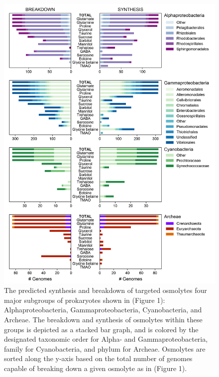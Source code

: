 \documentclass[utf8]{frontiers_suppmat} %
\begin{document}
\begin{figure}[ht]
    \centering
    \includegraphics[width=0.9\columnwidth]{Figures/SI-Groups-Syn_BD-01.png}
    \caption{The predicted synthesis and breakdown of targeted osmolytes four major subgroups of prokaryotes shown in (Figure 1): Alphaproteobacteria, Gammaproteobacteria, Cyanobacteria, and Archeae. The breakdown and synthesis of osmolytes within these groups is depicted as a stacked bar graph, and is colored by the designated taxonomic order for Alpha- and Gammaproteobacteria, family for Cyanobacteria, and phylum for Archeae. Osmolytes are sorted along the y-axis based on the total number of genomes capable of breaking down a given osmolyte as in (Figure 1).}
    \label{fig:groups}
\end{figure}
\end{document}

